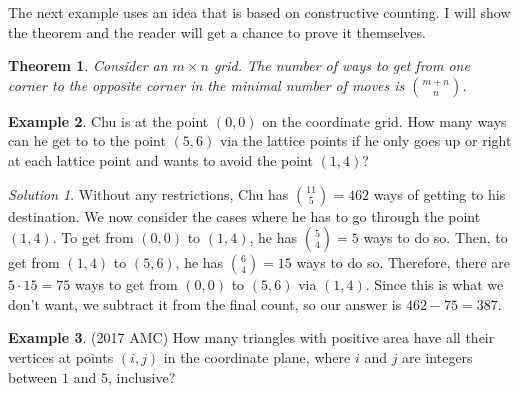 \documentclass[l1pt]{article}
\theoremstyle{plain}
\newtheorem{thm}{Theorem}[section]
\theoremstyle{definition}
\newtheorem{example}[thm]{Example}
\theoremstyle{remark}
\newtheorem*{solution}{Solution}
\begin{document}
The next example uses an idea that is based on constructive counting. I will show the theorem and the reader will get a chance to prove it themselves.




\begin{mdframed}
\begin{thm}
Consider an $m \times n$ grid. The number of ways to get from one corner to the opposite corner in the minimal number of moves is $\binom{m+n}{n}$.
\end{thm}
\end{mdframed}


\begin{example}
Chu is at the point $(0,0)$ on the coordinate grid. How many ways can he get to to the point $(5,6)$ via the lattice points if he only goes up or right at each lattice point and wants to avoid the point $(1,4)$?
\end{example}

\begin{solution}
Without any restrictions, Chu has $\binom{11}{5}=462$ ways of getting to his destination. We now consider the cases where he has to go through the point $(1,4).$ To get from $(0,0)$ to $(1,4)$, he has $\binom{5}{4}=5$ ways to do so. Then, to get from $(1,4)$ to $(5,6)$, he has $\binom{6}{4}=15$ ways to do so. Therefore, there are $5\cdot 15=75$ ways to get from $(0,0)$ to $(5,6)$ via $(1,4)$. Since this is what we don't want, we subtract it from the final count, so our answer is $462-75=387$.
\end{solution}



\begin{example}
(2017 AMC) How many triangles with positive area have all their vertices at points $(i,j)$ in the coordinate plane, where $i$ and $j$ are integers between $1$ and $5$, inclusive?
\end{example}
\end{document}
